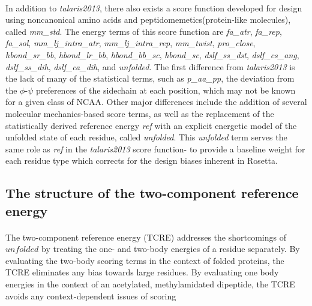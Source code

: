 \paragraph{}
In addition to \textit{talaris2013}, there also exists a score function developed for design using noncanonical amino acids and peptidomemetics(protein-like molecules), called \textit{mm\_std}\cite{renfrew_incorporation_2012}.
The energy terms of this score function are \textit{fa\_atr}, \textit{fa\_rep}, \textit{fa\_sol}, \textit{mm\_lj\_intra\_atr}, \textit{mm\_lj\_intra\_rep}, \textit{mm\_twist}, \textit{pro\_close}, \textit{hbond\_sr\_bb}, \textit{hbond\_lr\_bb}, \textit{hbond\_bb\_sc}, \textit{hbond\_sc}, \textit{dslf\_ss\_dst}, \textit{dslf\_cs\_ang}, \textit{dslf\_ss\_dih}, \textit{dslf\_ca\_dih}, and \textit{unfolded}.
The first difference from \textit{talaris2013} is the lack of many of the statistical terms, such as \textit{p\_aa\_pp}, the deviation from the $\phi$-$\psi$ preferences of the sidechain at each position, which may not be known for a given class of NCAA.
Other major differences include the addition of several molecular mechanics-based score terms, as well as the replacement of the statistically derived reference energy \textit{ref} with an explicit energetic model of the unfolded state of each residue, called \textit{unfolded}.
This \textit{unfolded} term serves the same role as \textit{ref} in the \textit{talaris2013} score function- to provide a baseline weight for each residue type which corrects for the design biases inherent in Rosetta.

\subsection{The structure of the two-component reference energy}
\paragraph{}
The two-component reference energy (TCRE) addresses the shortcomings of $unfolded$ by treating the one- and two-body energies of a residue separately.
By evaluating the two-body scoring terms in the context of folded proteins, the TCRE eliminates any bias towards large residues.
By evaluating one body energies in the context of an acetylated, methylamidated dipeptide, the TCRE avoids any context-dependent issues of scoring

